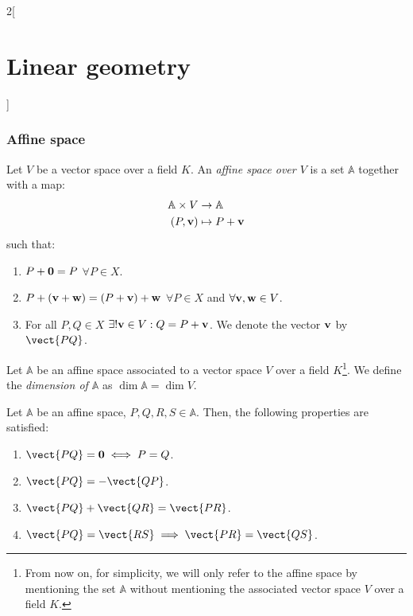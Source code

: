 \documentclass[../../../main.tex]{subfiles}
\begin{document}
\begin{multicols}{2}[\section{Linear geometry}]
    \subsubsection*{Affine space}
    \begin{definition}
        Let $V$ be a vector space over a field $K$. An \textit{affine space over $V$} is a set $\mathbb{A}$ together with a map:
        \begin{align*}
            \mathbb{A}\times V     & \rightarrow \mathbb{A}       \\
            (P,\boldsymbol{\mathrm{v}}) & \mapsto P+\boldsymbol{\mathrm{v}}
        \end{align*}
        such that:
        \begin{enumerate}
            \item $P+\boldsymbol{\mathrm{0}}=P$ $\forall P\in X$.
            \item $P+(\boldsymbol{\mathrm{v}}+\boldsymbol{\mathrm{w}})=(P+\boldsymbol{\mathrm{v}})+\boldsymbol{\mathrm{w}}$ $\forall P\in X$ and $\forall\boldsymbol{\mathrm{v}},\boldsymbol{\mathrm{w}}\in V$.
            \item For all $P,Q\in X$ $\exists!\boldsymbol{\mathrm{v}}\in V:Q=P+\boldsymbol{\mathrm{v}}$. We denote the vector $\boldsymbol{\mathrm{v}}$ by $\vect{PQ}$.
        \end{enumerate}
    \end{definition}
    \begin{definition}
        Let $\mathbb{A}$ be an affine space associated to a vector space $V$ over a field $K$\footnote{From now on, for simplicity, we will only refer to the affine space by mentioning the set $\mathbb{A}$ without mentioning the associated vector space $V$ over a field $K$.}. We define the \textit{dimension of $\mathbb{A}$} as $\dim\mathbb{A}=\dim V$.
    \end{definition}
    \begin{prop}
        Let $\mathbb{A}$ be an affine space, $P,Q,R,S\in\mathbb{A}$. Then, the following properties are satisfied:
        \begin{enumerate}
            \item $\vect{PQ}=\vectorfunction{0}\iff P=Q$.
            \item $\vect{PQ}=-\vect{QP}$.
            \item $\vect{PQ}+\vect{QR}=\vect{PR}$.
            \item $\vect{PQ}=\vect{RS}\implies\vect{PR}=\vect{QS}$.
        \end{enumerate}
    \end{prop}

\end{multicols}
\end{document}
